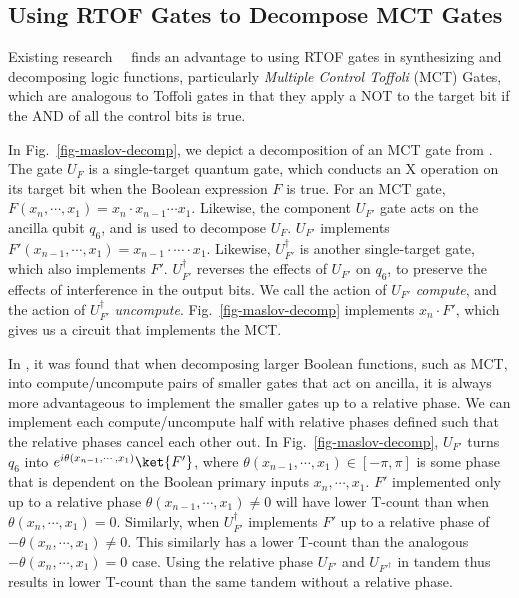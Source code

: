 \subsection{Using RTOF Gates to Decompose MCT Gates}
Existing research~\cite{bib-rtof-maslov}~\cite{bib-selinger-rtof} finds an advantage to using RTOF gates in
synthesizing and decomposing logic functions, particularly {\it Multiple Control Toffoli} (MCT) Gates, which
are analogous to Toffoli gates in that they apply a NOT to the target bit if the AND of all the control
bits is true.

In Fig.~\ref{fig-maslov-decomp}, we depict a decomposition of an MCT gate from \cite{bib-rtof-maslov}. The gate
$U_F$ is a single-target quantum gate, which conducts an X operation on its target bit when the Boolean expression
$F$ is true. For an MCT gate, $F(x_n,\cdots,x_1) = x_n \cdot x_{n-1} \cdots x_1$. Likewise, the component $U_{F'}$
gate acts on the ancilla qubit $q_6$, and is used to decompose $U_F$. $U_{F'}$  implements $F'(x_{n-1},\cdots,x_1) = x_{n-1} \cdot \cdots \cdot x_1$.
Likewise, $U_{F'}^{\dagger}$ is another single-target gate, which also implements $F'$.
$U_{F'}^{\dagger}$ reverses the effects of $U_{F'}$ on $q_6$, to preserve the effects of interference
in the output bits. We call the action of $U_{F'}$ \emph{compute}, and the action of $U_{F'}^{\dagger}$
\emph{uncompute}. Fig.~\ref{fig-maslov-decomp} implements $x_n \cdot F'$, which gives us a circuit that implements
the MCT.

In \cite{bib-rtof-maslov}, it was found that when decomposing larger Boolean functions, such as MCT, into compute/uncompute pairs of smaller gates that act on ancilla, it is always more advantageous to implement the smaller gates up to a relative phase. We can implement each compute/uncompute half with relative phases defined such that the relative phases cancel each other out. In Fig.~\ref{fig-maslov-decomp}, $U_{F'}$ turns $q_6$ into $e^{i\theta(x_{n-1},\cdots,x_1)}\ket{F'}$, where $\theta(x_{n-1},\cdots,x_1) \in [-\pi,\pi]$ is some phase that is dependent on the Boolean primary inputs $x_{n},\cdots,x_1$. $F'$ implemented only up to a relative phase $\theta(x_{n-1},\cdots,x_1) \neq 0$ will have lower T-count than when $\theta(x_{n},\cdots,x_1) = 0$. Similarly, when $U_{F'}^{\dagger}$ implements ${F'}$ up to a relative phase of $-\theta(x_{n},\cdots,x_1) \neq 0$. This similarly has a lower T-count than the analogous $-\theta(x_{n},\cdots,x_1) = 0$ case. Using the relative phase $U_{F'}$ and $U_{F'^{\dagger}}$ in tandem thus results in lower T-count than the same tandem without a relative phase.

